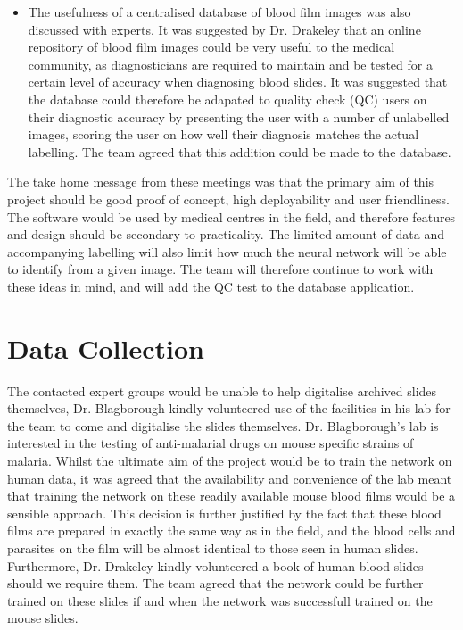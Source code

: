 \documentclass[a4paper,11pt]{article}
\begin{document}
\begin{itemize}
	\item The usefulness of a centralised database of blood film images was also discussed with experts. It was suggested by Dr. Drakeley that an online repository of blood film images could be very useful to the medical community, as diagnosticians are required to maintain and be tested for a certain level of accuracy when diagnosing blood slides. It was suggested that the database could therefore be adapated to quality check (QC) users on their diagnostic accuracy by presenting the user with a number of unlabelled images, scoring the user on how well their diagnosis matches the actual labelling. The team agreed that this addition could be made to the database.

\end{itemize}

The take home message from these meetings was that the primary aim of this project should be good proof of concept, high deployability and user friendliness. The software would be used by medical centres in the field, and therefore features and design should be secondary to practicality. The limited amount of data and accompanying labelling will also limit how much the neural network will be able to identify from a given image. The team will therefore continue to work with these ideas in mind, and will add the QC test to the database application.


\section{Data Collection}

The contacted expert groups would be unable to help digitalise archived slides themselves, Dr. Blagborough kindly volunteered use of the facilities in his lab for the team to come and digitalise the slides themselves. Dr. Blagborough's lab is interested in the testing of anti-malarial drugs on mouse specific strains of malaria. Whilst the ultimate aim of the project would be to train the network on human data, it was agreed that the availability and convenience of the lab meant that training the network on these readily available mouse blood films would be a sensible approach. This decision is further justified by the fact that these blood films are prepared in exactly the same way as in the field, and the blood cells and parasites on the film will be almost identical to those seen in human slides. Furthermore, Dr. Drakeley kindly volunteered a book of human blood slides should we require them. The team agreed that the network could be further trained on these slides if and when the network was successfull trained on the mouse slides.
\end{document}
